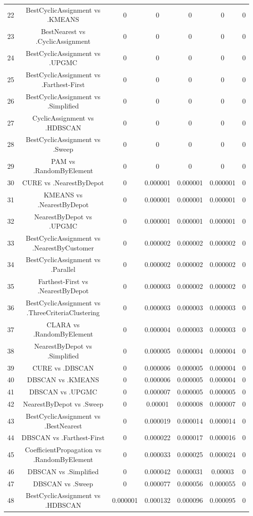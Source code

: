 \documentclass[a4paper,10pt]{article}
\begin{document}
\begin{landscape}
\begin{table}[!htp]
\begin{tabular}{ccccccc}
22&BestCyclicAssignment vs .KMEANS&0&0&0&0&0\\
23&BestNearest vs .CyclicAssignment&0&0&0&0&0\\
24&BestCyclicAssignment vs .UPGMC&0&0&0&0&0\\
25&BestCyclicAssignment vs .Farthest-First&0&0&0&0&0\\
26&BestCyclicAssignment vs .Simplified&0&0&0&0&0\\
27&CyclicAssignment vs .HDBSCAN&0&0&0&0&0\\
28&BestCyclicAssignment vs .Sweep&0&0&0&0&0\\
29&PAM vs .RandomByElement&0&0&0&0&0\\
30&CURE vs .NearestByDepot&0&0.000001&0.000001&0.000001&0\\
31&KMEANS vs .NearestByDepot&0&0.000001&0.000001&0.000001&0\\
32&NearestByDepot vs .UPGMC&0&0.000001&0.000001&0.000001&0\\
33&BestCyclicAssignment vs .NearestByCustomer&0&0.000002&0.000002&0.000002&0\\
34&BestCyclicAssignment vs .Parallel&0&0.000002&0.000002&0.000002&0\\
35&Farthest-First vs .NearestByDepot&0&0.000003&0.000002&0.000002&0\\
36&BestCyclicAssignment vs .ThreeCriteriaClustering&0&0.000003&0.000003&0.000003&0\\
37&CLARA vs .RandomByElement&0&0.000004&0.000003&0.000003&0\\
38&NearestByDepot vs .Simplified&0&0.000005&0.000004&0.000004&0\\
39&CURE vs .DBSCAN&0&0.000006&0.000005&0.000004&0\\
40&DBSCAN vs .KMEANS&0&0.000006&0.000005&0.000004&0\\
41&DBSCAN vs .UPGMC&0&0.000007&0.000005&0.000005&0\\
42&NearestByDepot vs .Sweep&0&0.00001&0.000008&0.000007&0\\
43&BestCyclicAssignment vs .BestNearest&0&0.000019&0.000014&0.000014&0\\
44&DBSCAN vs .Farthest-First&0&0.000022&0.000017&0.000016&0\\
45&CoefficientPropagation vs .RandomByElement&0&0.000033&0.000025&0.000024&0\\
46&DBSCAN vs .Simplified&0&0.000042&0.000031&0.00003&0\\
47&DBSCAN vs .Sweep&0&0.000077&0.000056&0.000055&0\\
48&BestCyclicAssignment vs .HDBSCAN&0.000001&0.000132&0.000096&0.000095&0\\

\end{tabular}
\end{table}
\end{landscape}
\end{document}
